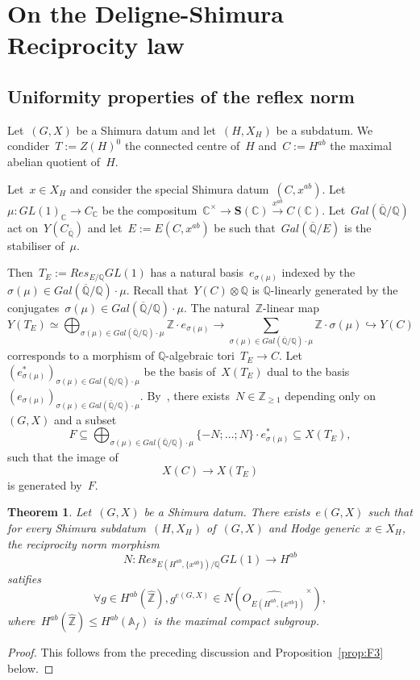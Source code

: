 \documentclass[12pt]{amsart}
\newtheorem{theorem}{Theorem}[section]
\newcommand{\Z}{{\mathbb Z}}
\newcommand{\Q}{{\mathbb Q}}
\newcommand{\C}{{\mathbb C}}
\newcommand{\A}{{\mathbb A}}
\newcommand{\ol}{\overline}
\newcommand{\wh}{\widehat}
\newcommand{\tens}{\otimes}
\begin{document}
\section{On the Deligne-Shimura Reciprocity law}\label{sec:appendix reciprocity}
\subsection{Uniformity properties of the reflex norm}

Let~$(G,X)$ be a Shimura datum and let~$(H,X_H)$ be a subdatum. We condider~$T:=Z(H)^0$ the connected centre of~$H$ and~$C:=H^{ab}$ the maximal abelian quotient of~$H$.

Let~$x\in X_H$ and consider the special Shimura datum~$(C,x^{ab})$. Let~$\mu:GL(1)_\C\to C_\C$ be the compositum~$\C^\times \to \mathbf{S}(\C)\xrightarrow{x^{ab}}C(\C)$. Let~$Gal(\ol{\Q}/\Q)$ act on~$Y(C_{\ol{\Q}})$ and let~$E:=E(C,x^{ab})$ be such that~$Gal(\ol{\Q}/E)$ is the stabiliser of~$\mu$.

Then~$T_E:=Res_{E/\Q}GL(1)$ has a natural basis~$e_{\sigma(\mu)}$ indexed by the~$\sigma(\mu)\in Gal(\ol{\Q}/\Q)\cdot \mu$. Recall that~$Y(C)\tens\Q$ is $\Q$-linearly generated by the conjugates~$\sigma(\mu)\in Gal(\ol{\Q}/\Q)\cdot \mu$. The natural~$\Z$-linear map
\[
Y(T_E)\simeq \bigoplus_{\sigma(\mu)\in Gal(\ol{\Q}/\Q)\cdot \mu} \Z \cdot e_{\sigma(\mu)}
\to 
\sum_{\sigma(\mu)\in Gal(\ol{\Q}/\Q)\cdot \mu} \Z\cdot \sigma(\mu)\hookrightarrow Y(C)
\]
corresponds to a morphism of $\Q$-algebraic tori~$T_E\to C$. Let $(e^*_{\sigma(\mu)})_{\sigma(\mu)\in Gal(\ol{\Q}/\Q)\cdot \mu}$ be the basis of~$X(T_E)$ dual to the basis~$(e_{\sigma(\mu)})_{\sigma(\mu)\in Gal(\ol{\Q}/\Q)\cdot \mu}$.
By~\cite[Lem. 2.6 and \S2,1]{UY}, there exists~$N\in\Z_{\geq1}$ depending only on~$(G,X)$ and a subset
\[
F\subseteq \bigoplus_{\sigma(\mu)\in Gal(\ol{\Q}/\Q)\cdot \mu} \{-N;\ldots;N\}\cdot e^*_{\sigma(\mu)}\subseteq X(T_E),
\]
 such that the image of
\[
X(C)\to X(T_E)
\]
is generated by~$F$.
\begin{theorem}\label{thm:F1}
 Let~$(G,X)$ be a Shimura datum. 
There exists~$e(G,X)$ such that for every Shimura subdatum~$(H,X_H)$ of~$(G,X)$ and Hodge generic~$x\in X_H$, the reciprocity norm morphism
\[
N:Res_{E(H^{ab},\{x^{ab}\})/\Q}GL(1)\to H^{ab}
\]
satifies
\[
\forall g\in H^{ab}(\wh{\Z}), g^{e(G,X)}\in  N\left(\wh{O_{E(H^{ab},\{x^{ab}\})}}^\times\right),
\]
where~$H^{ab}(\wh{\Z})\leq H^{ab}(\A_f)$ is the maximal compact subgroup.
\end{theorem}
\begin{proof} This follows from the preceding discussion and Proposition~\ref{prop:F3} below.
\end{proof}
\end{document}
